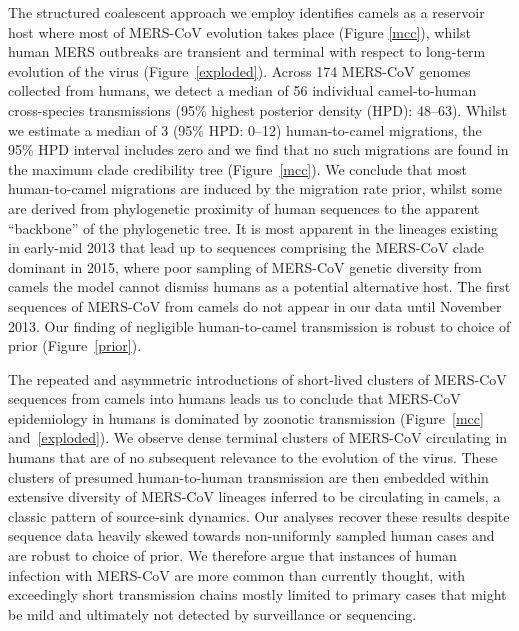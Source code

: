 \documentclass[11pt,oneside,letterpaper]{article}
\def\gdc#1{\textcolor{blue}{[#1]}}
\def\lmc#1{\textcolor{green}{[#1]}}
\begin{document}
The structured coalescent approach we employ \citep{vaughan_efficient_2014} identifies camels as a reservoir host where most of MERS-CoV evolution takes place (Figure \ref{mcc}), whilst human MERS outbreaks are transient and terminal with respect to long-term evolution of the virus (Figure~\ref{exploded}).
Across 174 MERS-CoV genomes collected from humans, we detect a median of 56 individual camel-to-human cross-species transmissions (95\% highest posterior density (HPD): 48--63).
Whilst we %
estimate a median of 3 (95\% HPD: 0--12) human-to-camel migrations, the 95\% HPD interval includes zero and we find that no such migrations are found in the maximum clade credibility tree (Figure~\ref{mcc}).
We conclude that most human-to-camel migrations are induced by the migration rate prior, whilst some are derived from phylogenetic proximity of human sequences to the apparent ``backbone'' of the phylogenetic tree.
It is most apparent in the lineages existing in early-mid 2013 that lead up to sequences comprising the MERS-CoV clade dominant in 2015, where poor sampling of MERS-CoV genetic diversity from camels %
the model cannot dismiss humans as a potential alternative host.
The first sequences of MERS-CoV from camels do not appear in our data until November 2013.
Our finding of negligible human-to-camel transmission is robust to choice of prior (Figure~\ref{prior}).

The repeated and asymmetric introductions of short-lived clusters of MERS-CoV sequences from camels into humans leads us to conclude that MERS-CoV epidemiology in humans is dominated by zoonotic transmission (Figure~\ref{mcc} and~\ref{exploded}).
We observe dense terminal clusters of MERS-CoV circulating in humans that are of no subsequent relevance to the evolution of the virus.
These clusters of presumed human-to-human transmission are then embedded within extensive diversity of MERS-CoV lineages inferred to be circulating in camels, a classic pattern of source-sink dynamics.
Our analyses recover these results despite sequence data heavily skewed towards non-uniformly %
sampled human cases and are robust to choice of prior.
We therefore argue that instances of human infection with MERS-CoV are more common than currently thought, with exceedingly short transmission chains mostly limited to primary cases that might be mild and ultimately not detected by surveillance or sequencing.
\end{document}
